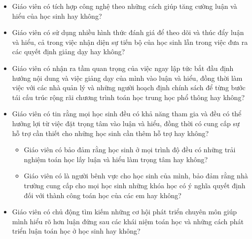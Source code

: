 \documentclass[
  10pt,
  a4paper,
  landscape,
  twoside,
  openany
]{scrbook}
\begin{document}
{{\begin{itemize}
    \item Giáo viên có tích hợp công nghệ theo những cách giúp tăng cường luận và hiểu của học sinh hay không?
    \item Giáo viên có sử dụng nhiều hình thức đánh giá để theo dõi và thúc đẩy luận và hiểu, cả trong việc nhận diện sự tiến bộ của học sinh lẫn trong việc đưa ra các quyết định giảng dạy hay không?
    \item Giáo viên có nhận ra tầm quan trọng của việc ngay lập tức bắt đầu định hướng nội dung và việc giảng dạy của mình vào luận và hiểu, đồng thời làm việc với các nhà quản lý và những người hoạch định chính sách để từng bước tái cấu trúc rộng rãi chương trình toán học trung học phổ thông hay không?
    \item Giáo viên có tin rằng mọi học sinh đều có khả năng tham gia và đều có thể hưởng lợi từ việc đặt trọng tâm vào luận và hiểu, đồng thời có cung cấp sự hỗ trợ cần thiết cho những học sinh cần thêm hỗ trợ hay không?
      \begin{itemize}
        \item Giáo viên có bảo đảm rằng học sinh ở mọi trình độ đều có những trải nghiệm toán học lấy luận và hiểu làm trọng tâm hay không?
        \item Giáo viên có là người bênh vực cho học sinh của mình, bảo đảm rằng nhà trường cung cấp cho mọi học sinh những khóa học có ý nghĩa quyết định đối với thành công toán học của các em hay không?
      \end{itemize}
    \item Giáo viên có chủ động tìm kiếm những cơ hội phát triển chuyên môn giúp mình hiểu rõ hơn luận đứng sau các khái niệm toán học và những cách phát triển luận toán học ở học sinh hay không?
  \end{itemize}}
}
\end{document}
